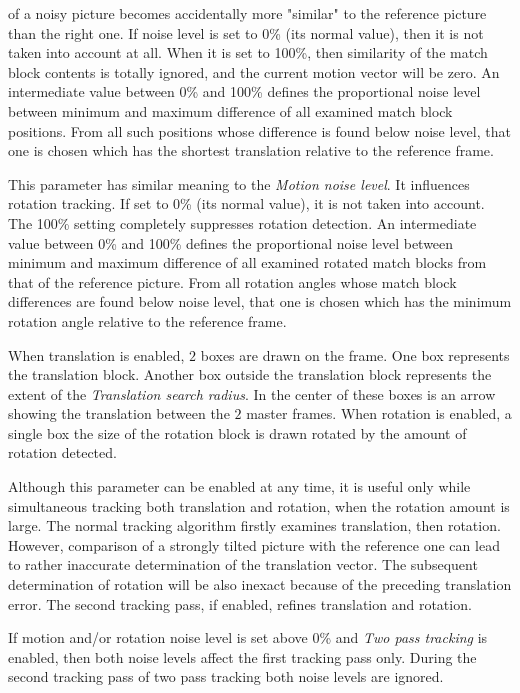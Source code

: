 \begin{description}
    of a noisy picture becomes accidentally more "similar" to the reference
    picture than the right one.  If noise level is set to 0\% (its normal value),
    then it is not taken into account at all.  When it is set to 100\%, then
    similarity of the match block contents is totally ignored, and the current
    motion vector will be zero.  An intermediate value between 0\% and 100\%
    defines the proportional noise level between minimum and maximum difference
    of all examined match block positions.  From all such positions whose
    difference is found below noise level, that one is chosen which has the
    shortest translation relative to the reference frame.
    \item[Rotation noise level] This parameter has similar meaning to the \textit{Motion noise level}.  It influences rotation tracking.  If set to 0\% (its normal value),
    it is not taken into account.  The 100\% setting completely suppresses
    rotation detection.  An intermediate value between 0\% and 100\% defines the
    proportional noise level between minimum and maximum difference of all
    examined rotated match blocks from that of the reference picture.  From all
    rotation angles whose match block differences are found below noise level,
    that one is chosen which has the minimum rotation angle relative to the
    reference frame.    
    \item[Draw vectors] When translation is enabled, $2$ boxes are drawn on the frame. One box represents the translation block. Another box outside the translation block represents the extent of the \textit{Translation search radius}. In the center of these boxes is an arrow showing the translation between the $2$ master frames. When rotation is enabled, a single box the size of the rotation block is drawn rotated by the amount of rotation detected.
    \item[Two pass tracking] Although this parameter can be enabled at any time, it is useful only while simultaneous tracking both translation and rotation, when
    the rotation amount is large.  The normal tracking algorithm firstly
    examines translation, then rotation.  However, comparison of a strongly
    tilted picture with the reference one can lead to rather inaccurate
    determination of the translation vector.  The subsequent determination of
    rotation will be also inexact because of the preceding translation error.  The
    second tracking pass, if enabled, refines translation and rotation.
    
    If motion and/or rotation noise level is set above 0\% and \textit{Two pass tracking}
    is enabled, then both noise levels affect the first tracking pass only.
    During the second tracking pass of two pass tracking both noise levels are
    ignored.
    

\end{description}
